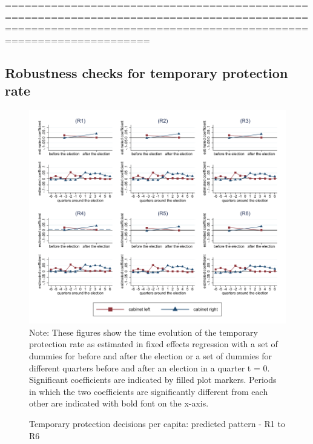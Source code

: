\documentclass[11pt,a4paper]{scrartcl}
\begin{document}
 ================================================================================================================================================================
\clearpage
\FloatBarrier
\subsection{Robustness checks for temporary protection rate}



\clearpage
\FloatBarrier
\begin{figure}[!ht]
	\caption{Temporary protection decisions per capita: predicted pattern - R1 to R6}
	\includegraphics[width=1\textwidth]{../results/decisions/temporary_protection_rate_graphs_R1-R6.pdf}
	\scriptsize{Note: These figures show the time evolution of the temporary protection rate as estimated in fixed effects regression with a set of dummies for before and after the election or a set of dummies for different quarters before and after an election in a quarter t = 0. Significant coefficients are indicated by filled plot markers. Periods in which the two coefficients are significantly different from each other are indicated with bold font on the x-axis.}
\end{figure}

\clearpage
\FloatBarrier


\end{document}
